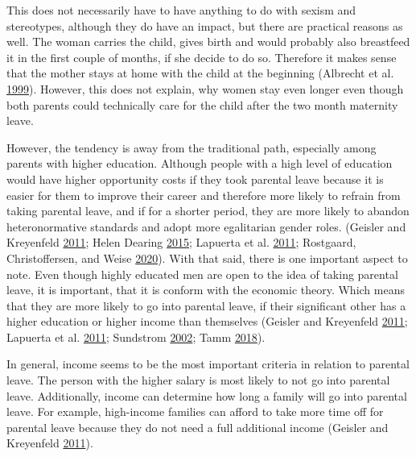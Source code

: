 \documentclass[
  12pt,
]{article}
\begin{document}
This does not necessarily have to have anything to do with sexism and stereotypes, although they do have an impact, but there are practical reasons as well. The woman carries the child, gives birth and would probably also breastfeed it in the first couple of months, if she decide to do so. Therefore it makes sense that the mother stays at home with the child at the beginning (Albrecht et al. \protect\hyperlink{ref-albrecht_career_1999}{1999}). However, this does not explain, why women stay even longer even though both parents could technically care for the child after the two month maternity leave.

However, the tendency is away from the traditional path, especially among parents with higher education. Although people with a high level of education would have higher opportunity costs if they took parental leave because it is easier for them to improve their career and therefore more likely to refrain from taking parental leave, and if for a shorter period, they are more likely to abandon heteronormative standards and adopt more egalitarian gender roles. (Geisler and Kreyenfeld \protect\hyperlink{ref-geisler_against_2011}{2011}; Helen Dearing \protect\hyperlink{ref-helen_dearing_does_2015}{2015}; Lapuerta et al. \protect\hyperlink{ref-lapuerta_individual_2011}{2011}; Rostgaard, Christoffersen, and Weise \protect\hyperlink{ref-rostgaard_parental_2020}{2020}).
With that said, there is one important aspect to note. Even though highly educated men are open to the idea of taking parental leave, it is important, that it is conform with the economic theory. Which means that they are more likely to go into parental leave, if their significant other has a higher education or higher income than themselves (Geisler and Kreyenfeld \protect\hyperlink{ref-geisler_against_2011}{2011}; Lapuerta et al. \protect\hyperlink{ref-lapuerta_individual_2011}{2011}; Sundstrom \protect\hyperlink{ref-sundstrom_gender_2002}{2002}; Tamm \protect\hyperlink{ref-tamm_fathers_2018}{2018}).

In general, income seems to be the most important criteria in relation to parental leave. The person with the higher salary is most likely to not go into parental leave. Additionally, income can determine how long a family will go into parental leave. For example, high-income families can afford to take more time off for parental leave because they do not need a full additional income (Geisler and Kreyenfeld \protect\hyperlink{ref-geisler_against_2011}{2011}).
\end{document}
